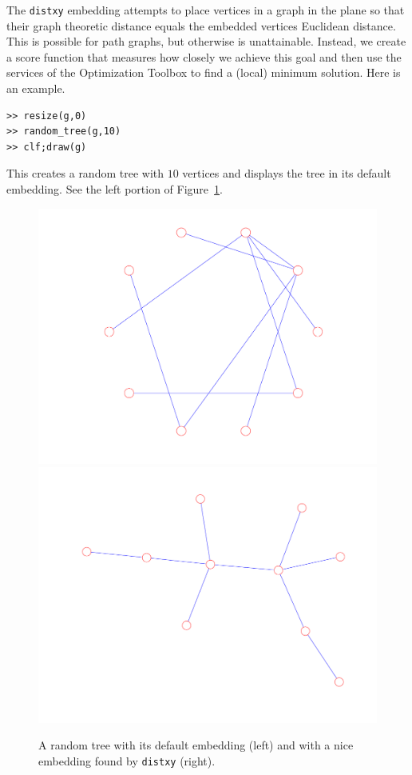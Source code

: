 \documentclass[12pt]{amsart}
\begin{document}
The \verb|distxy| embedding attempts to place vertices in a graph in
the plane so that their graph theoretic distance equals the embedded
vertices Euclidean distance. This is possible for path graphs, but
otherwise is unattainable. Instead, we create a score function that
measures how closely we achieve this goal and then use the services of
the Optimization Toolbox to find a (local) minimum solution. Here is
an example.
\begin{verbatim}
>> resize(g,0)
>> random_tree(g,10)
>> clf;draw(g)
\end{verbatim}
This creates a random tree with $10$ vertices and displays the tree in
its default embedding. See the left portion of Figure~\ref{fig:randtree}.
\begin{figure}[ht]
  \begin{center}
    \includegraphics[scale=0.3]{figs/randtree-yuck}
    \includegraphics[scale=0.3]{figs/randtree-nice}
  \end{center}
  \caption{A random tree with its default embedding (left)
    and with a nice embedding found by \texttt{distxy} (right).}
  \label{fig:randtree}
\end{figure}
\end{document}

